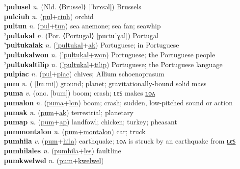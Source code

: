 \textbf{'pulusel} \textit{n.} (Nld. ⟨Brussel⟩ [ˈbrʏsəl])
Brussels \label{'pulusel} \\
\textbf{pulciuh} \textit{n.} (\hyperref[pul]{pul}+\hyperref[ciuh]{ciuh})
orchid \label{pulciuh} \\
\textbf{pultun} \textit{n.} (\hyperref[pul]{pul}+\hyperref[tun]{tun})
sea anemone; sea fan; seawhip \label{pultun} \\
\textbf{'pultukal} \textit{n.} (Por. ⟨Portugal⟩ [puɾtuˈɣal])
Portugal \label{'pultukal} \\
\textbf{'pultukalak} \textit{n.} (\hyperref['pultukal]{'pultukal}+\hyperref[ak]{ak})
Portuguese; in Portuguese \label{'pultukalak} \\
\textbf{'pultukalwon} \textit{n.} (\hyperref['pultukal]{'pultukal}+\hyperref[won]{won})
Portuguese; the Portuguese people \label{'pultukalwon} \\
\textbf{'pultukaltilip} \textit{n.} (\hyperref['pultukal]{'pultukal}+\hyperref[tilip]{tilip})
Portuguese; the Portuguese language \label{'pultukaltilip} \\
\textbf{pulpiac} \textit{n.} (\hyperref[pul]{pul}+\hyperref[piac]{piac})
chives; Allium schoenoprasum \label{pulpiac} \\
\textbf{pum} \textit{n.} ( [b̤uːmi])
ground; planet; gravitationally-bound solid mass \label{pum} \\
\textbf{puma} \textit{v.} (ono. [bum])
boom; crash; ʟєꜱ makes \hyperref[pumalon]{ʟᴏᴧ} \label{puma} \\
\textbf{pumalon} \textit{n.} (\hyperref[puma]{puma}+\hyperref[lon]{lon})
boom; crash; sudden, low-pitched sound or action \label{pumalon} \\
\textbf{pumak} \textit{n.} (\hyperref[pum]{pum}+\hyperref[ak]{ak})
terrestrial; planetary \label{pumak} \\
\textbf{pumap} \textit{n.} (\hyperref[pum]{pum}+\hyperref[ap]{ap})
landfowl; chicken; turkey; pheasant \label{pumap} \\
\textbf{pummontalon} \textit{n.} (\hyperref[pum]{pum}+\hyperref[montalon]{montalon})
car; truck \label{pummontalon} \\
\textbf{pumhila} \textit{v.} (\hyperref[pum]{pum}+\hyperref[hila]{hila})
earthquake; ʟᴏᴧ is struck by an earthquake from \hyperref[pumhilales]{ʟєꜱ} \label{pumhila} \\
\textbf{pumhilales} \textit{n.} (\hyperref[pumhila]{pumhila}+\hyperref[les]{les})
faultline \label{pumhilales} \\
\textbf{pumkwelwel} \textit{n.} (\hyperref[pum]{pum}+\hyperref[kwelwel]{kwelwel})
